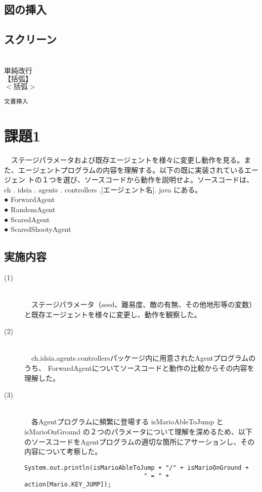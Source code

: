 \documentclass[a4j]{jarticle}
\begin{document}
\subsection{図の挿入}

\subsection{スクリーン}
\begin{screen}
~\\
単純改行\\
$【括弧】$\\
$<括弧>$ \\
\end{screen}
\begin{verbatim}
文書挿入
\end{verbatim}

\section{課題1}
\begin{screen}
　ステージパラメータおよび既存エージェントを様々に変更し動作を見る。また、エージェントプログラムの内容を理解する。以下の既に実装されているエージェン
トの１つを選び、ソースコードから動作を説明せよ。ソースコードは、ch . idsia . agents . controllers .[エージェント名]. java にある。\\
● ForwardAgent \\
● RandomAgent \\
● ScaredAgent \\
● ScaredShootyAgent 
\end{screen}
\subsection{実施内容}
\begin{description}
\item[(1)]~\\
　ステージパラメータ（seed、難易度、敵の有無、その他地形等の変数）と既存エージェントを様々に変更し、動作を観察した。
\item[(2)]~\\
　ch.idsia.agents.controllersパッケージ内に用意されたAgentプログラムのうち、
ForwardAgentについてソースコードと動作の比較からその内容を理解した。
\item[(3)]~\\
　各Agentプログラムに頻繁に登場する isMarioAbleToJump と isMarioOnGround の２つのパラメータについて理解を深めるため、以下のソースコードをAgentプログラムの適切な箇所にアサーションし、その内容について考察した。
\begin{verbatim}
System.out.println(isMarioAbleToJump + "/" + isMarioOnGround + 
                                 " = " + action[Mario.KEY_JUMP]);
\end{verbatim}
\end{description}
\end{document}
